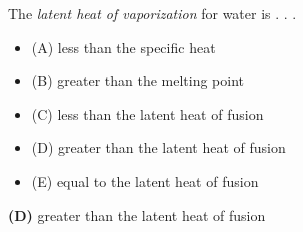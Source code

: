 

The {\it latent heat of vaporization} for water is . . .

\begin{itemize}
\item{(A)} less than the specific heat
\vskip 5pt 
\item{(B)} greater than the melting point
\vskip 5pt 
\item{(C)} less than the latent heat of fusion
\vskip 5pt 
\item{(D)} greater than the latent heat of fusion
\vskip 5pt 
\item{(E)} equal to the latent heat of fusion
\end{itemize}







{\bf (D)} greater than the latent heat of fusion
 










